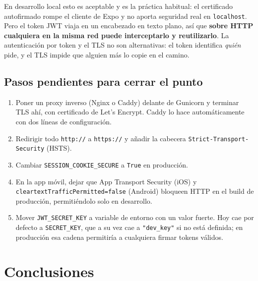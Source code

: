 \documentclass[11pt,letterpaper]{article}
\begin{document}
\vspace{0.5em}
En desarrollo local esto es aceptable y es la práctica habitual: el certificado autofirmado
rompe el cliente de Expo y no aporta seguridad real en \texttt{localhost}. Pero el token JWT
viaja en un encabezado en texto plano, así que \textbf{sobre HTTP cualquiera en la misma red
puede interceptarlo y reutilizarlo}. La autenticación por token y el TLS no son alternativas:
el token identifica \emph{quién} pide, y el TLS impide que alguien más lo copie en el camino.

\subsection*{Pasos pendientes para cerrar el punto}

\begin{enumerate}[leftmargin=1.4em,itemsep=3pt]
  \item Poner un proxy inverso (Nginx o Caddy) delante de Gunicorn y terminar TLS ahí, con
        certificado de Let's Encrypt. Caddy lo hace automáticamente con dos líneas de
        configuración.
  \item Redirigir todo \texttt{http://} a \texttt{https://} y añadir la cabecera
        \texttt{Strict-Transport-Security} (HSTS).
  \item Cambiar \texttt{SESSION\_COOKIE\_SECURE} a \texttt{True} en producción.
  \item En la app móvil, dejar que App Transport Security (iOS) y
        \texttt{cleartextTrafficPermitted=false} (Android) bloqueen HTTP en el build de
        producción, permitiéndolo solo en desarrollo.
  \item Mover \texttt{JWT\_SECRET\_KEY} a variable de entorno con un valor fuerte. Hoy cae por
        defecto a \texttt{SECRET\_KEY}, que a su vez cae a \texttt{"dev\_key"} si no está
        definida; en producción esa cadena permitiría a cualquiera firmar tokens válidos.
\end{enumerate}

\section{Conclusiones}
\end{document}
